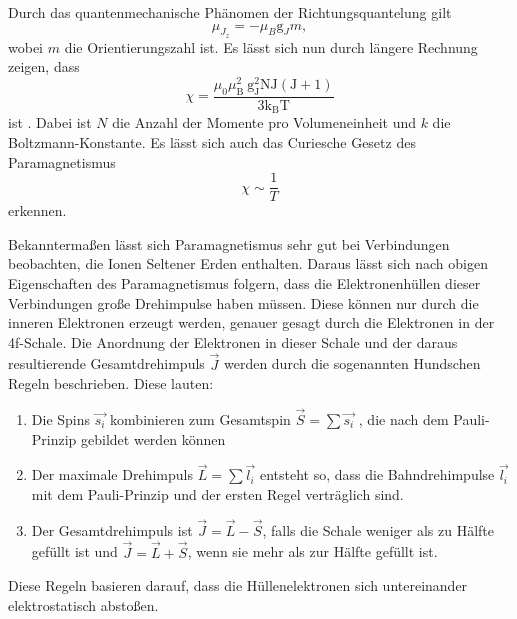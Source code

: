 Durch das quantenmechanische Phänomen der Richtungsquantelung gilt
\begin{equation}
    \mu_{J_z} = - \mu_B \text{g}_J m,
\end{equation}
wobei $m$ die Orientierungszahl ist.
Es lässt sich nun durch längere Rechnung zeigen, dass
\begin{equation}
    \chi=\frac{\mu_{0} \mu_{\mathrm{B}}^{2} \mathrm{~g}_{\mathrm{J}}^{2} \mathrm{NJ}(\mathrm{J}+1)}{3 \mathrm{k_B T}}
\end{equation}
ist \cite{v606}.
Dabei ist $N$ die Anzahl der Momente pro Volumeneinheit und $k$ die Boltzmann-Konstante.
Es lässt sich auch das Curiesche Gesetz des Paramagnetismus
\begin{equation}
    \chi \sim \frac{1}{T}
\end{equation}
erkennen.

Bekanntermaßen lässt sich Paramagnetismus sehr gut bei Verbindungen beobachten, die Ionen Seltener Erden enthalten.
Daraus lässt sich nach obigen Eigenschaften des Paramagnetismus folgern, dass die Elektronenhüllen dieser Verbindungen große Drehimpulse haben müssen.
Diese können nur durch die inneren Elektronen erzeugt werden, genauer gesagt durch die Elektronen in der 4f-Schale.
Die Anordnung der Elektronen in dieser Schale und der daraus resultierende Gesamtdrehimpuls $\vec{J}$ werden durch die sogenannten Hundschen Regeln beschrieben.
Diese lauten:
\begin{enumerate}
    \item Die Spins $\vec{s_i}$ kombinieren zum Gesamtspin $\vec{S} = \sum \vec{s_i}$ , die nach dem Pauli-Prinzip gebildet werden können
    \item Der maximale Drehimpuls $\vec{L} = \sum \vec{l_i}$ entsteht so, dass die Bahndrehimpulse $\vec{l_i}$ mit dem Pauli-Prinzip und der ersten Regel verträglich sind.
    \item Der Gesamtdrehimpuls ist $\vec{J} = \vec{L} - \vec{S}$, falls die Schale weniger als zu Hälfte gefüllt ist und $\vec{J} = \vec{L} + \vec{S}$, wenn sie mehr als zur Hälfte gefüllt ist.
\end{enumerate}

Diese Regeln basieren darauf, dass die Hüllenelektronen sich untereinander elektrostatisch abstoßen.


